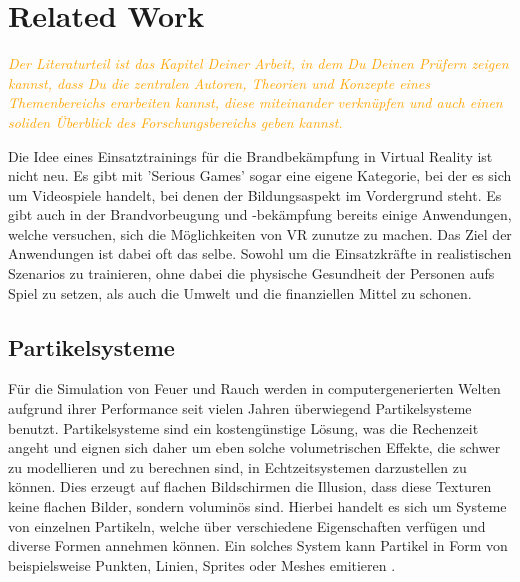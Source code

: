 \section{Related Work}

\emph{
    \textcolor{orange}{
    Der Literaturteil ist das Kapitel Deiner Arbeit, in dem Du Deinen Prüfern zeigen kannst, dass Du die zentralen Autoren, 
    Theorien und Konzepte eines Themenbereichs erarbeiten kannst, diese miteinander verknüpfen und auch einen soliden 
    Überblick des Forschungsbereichs geben kannst.
    }
}


Die Idee eines Einsatztrainings für die Brandbekämpfung in Virtual Reality ist nicht neu. Es gibt mit
'Serious Games' sogar eine eigene Kategorie, bei der es sich um Videospiele handelt, bei denen der
Bildungsaspekt im Vordergrund steht. Es gibt auch in der Brandvorbeugung und -bekämpfung bereits einige Anwendungen,
welche versuchen, sich die Möglichkeiten von VR zunutze zu machen.
Das Ziel der Anwendungen ist dabei oft das selbe. Sowohl um die Einsatzkräfte in realistischen Szenarios zu trainieren,
ohne dabei die physische Gesundheit der Personen aufs Spiel zu setzen, als auch die Umwelt und die finanziellen Mittel zu schonen.


\subsection{Partikelsysteme}
Für die Simulation von Feuer und Rauch werden in computergenerierten Welten aufgrund ihrer  Performance seit vielen Jahren 
überwiegend Partikelsysteme benutzt. 
Partikelsysteme sind ein kostengünstige Lösung, was die Rechenzeit angeht und eignen sich daher um eben solche
volumetrischen Effekte, die schwer zu modellieren und zu berechnen sind, in Echtzeitsystemen darzustellen zu können. 
Dies erzeugt auf flachen Bildschirmen die Illusion, dass diese Texturen keine flachen Bilder, 
sondern voluminös sind. Hierbei handelt es sich um Systeme von einzelnen Partikeln, welche über verschiedene 
Eigenschaften verfügen und diverse Formen annehmen können. Ein solches System kann Partikel in Form von beispielsweise Punkten, 
Linien, Sprites oder Meshes emitieren \parencite{Reeves1983}.


